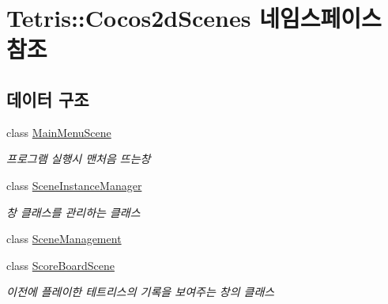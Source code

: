 \hypertarget{namespace_tetris_1_1_cocos2d_scenes}{}\section{Tetris\+:\+:Cocos2d\+Scenes 네임스페이스 참조}
\label{namespace_tetris_1_1_cocos2d_scenes}
\subsection*{데이터 구조}
\begin{DoxyCompactItemize}
\item 
class \hyperlink{class_tetris_1_1_cocos2d_scenes_1_1_main_menu_scene}{Main\+Menu\+Scene}
\begin{DoxyCompactList}\small\item\em 프로그램 실행시 맨처음 뜨는창 \end{DoxyCompactList}\item 
class \hyperlink{class_tetris_1_1_cocos2d_scenes_1_1_scene_instance_manager}{Scene\+Instance\+Manager}
\begin{DoxyCompactList}\small\item\em 창 클래스를 관리하는 클래스 \end{DoxyCompactList}\item 
class \hyperlink{class_tetris_1_1_cocos2d_scenes_1_1_scene_management}{Scene\+Management}
\item 
class \hyperlink{class_tetris_1_1_cocos2d_scenes_1_1_score_board_scene}{Score\+Board\+Scene}
\begin{DoxyCompactList}\small\item\em 이전에 플레이한 테트리스의 기록을 보여주는 창의 클래스 \end{DoxyCompactList}\end{DoxyCompactItemize}
